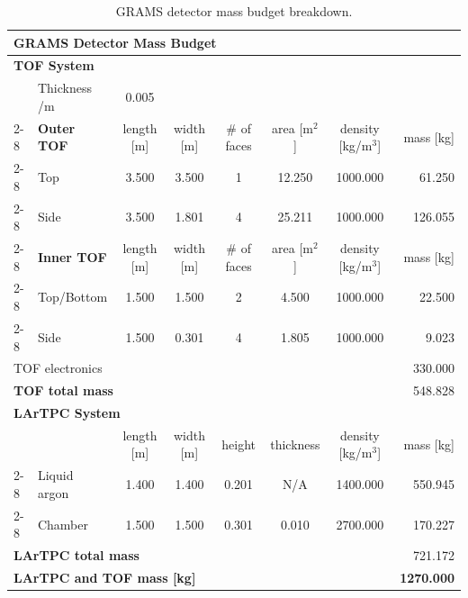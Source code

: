 \begin{table}
\centering
\small
\renewcommand{\arraystretch}{1.2}
\begin{tabular}{|l|l|c|c|c|c|c|r|}
\hline
\multicolumn{8}{|l|}{\textbf{GRAMS Detector Mass Budget}} \\ \hline %
\multicolumn{8}{|l|}{\textbf{TOF System}} \\ \hline %
& Thickness /m & 0.005 & \multicolumn{5}{l|}{} \\ \cline{2-8}
& \textbf{Outer TOF} & length [m] & width [m] & \# of faces & area [m$^2$] & density [kg/m$^3$] & mass [kg] \\ \cline{2-8}
& Top & 3.500 & 3.500 & 1 & 12.250 & 1000.000 & 61.250 \\ \cline{2-8}
& Side & 3.500 & 1.801 & 4 & 25.211 & 1000.000 & 126.055 \\ \cline{2-8}
& \textbf{Inner TOF} & length [m] & width [m] & \# of faces & area [m$^2$] & density [kg/m$^3$] & mass [kg] \\ \cline{2-8}
& Top/Bottom & 1.500 & 1.500 & 2 & 4.500 & 1000.000 & 22.500 \\ \cline{2-8}
& Side & 1.500 & 0.301 & 4 & 1.805 & 1000.000 & 9.023 \\ \hline
\multicolumn{7}{|l|}{TOF electronics} & 330.000 \\ \hline
\multicolumn{7}{|l|}{\textbf{TOF total mass}} & 548.828 \\ \hline
\multicolumn{8}{|l|}{\textbf{LArTPC System}} \\ \hline
& & length [m] & width [m] & height & thickness & density [kg/m$^3$] & mass [kg] \\ \cline{2-8}
& Liquid argon & 1.400 & 1.400 & 0.201 & N/A & 1400.000 & 550.945 \\ \cline{2-8}
& Chamber & 1.500 & 1.500 & 0.301 & 0.010 & 2700.000 & 170.227 \\ \hline
\multicolumn{7}{|l|}{\textbf{LArTPC total mass}} & 721.172 \\ \hline
\multicolumn{7}{|l|}{\textbf{\ac{LArTPC} and TOF mass [kg]}} & \textbf{1270.000} \\ \hline
\end{tabular}
\caption{GRAMS detector mass budget breakdown.}
\label{tab:grams_mass_budget}
\end{table}

